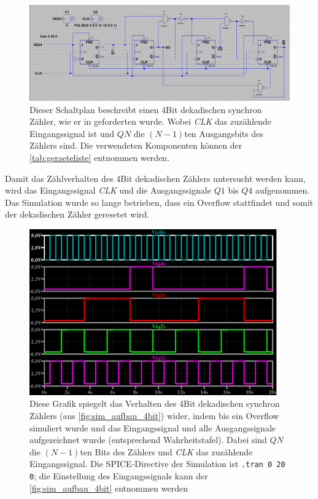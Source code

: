 \documentclass[12pt,english,ngerman]{scrartcl}
\begin{document}
\begin{figure}[H]
  \centering
    \includegraphics[width=\linewidth]{./figures/sim/4bit/aufbau4bit.png}
    \caption{Dieser Schaltplan beschreibt einen 4Bit dekadischen synchron
      Zähler, wie er in  geforderten wurde. Wobei
      \textit{CLK} das zuzählende Eingangssignal ist und $QN$ die $(N-1)$ten
      Ausgangsbits des Zählers sind. Die verwendeten Komponenten können der
      \autoref{tab:geraeteliste} entnommen werden.}
  \label{fig:sim_aufbau_4bit}
\end{figure}

Damit das Zählverhalten des 4Bit dekadischen Zählers untersucht werden kann,
wird das Eingangssignal \textit{CLK} und die Ausgangssignale $Q1$ bis $Q4$
aufgenommen. Das Simulation wurde so lange betrieben, dass ein Overflow
stattfindet und somit der dekadischen Zähler geresetet wird. 

\begin{figure}[H]
  \centering
    \includegraphics[width=0.95\textwidth]{./figures/sim/4bit/4bitdekawahrheit.png}
  \caption{Diese Grafik spiegelt das Verhalten des
    4Bit dekadischen synchron Zählers (aus \autoref{fig:sim_aufbau_4bit})
    wider, indem bis ein Overflow simuliert wurde und das Eingangssignal und
    alle Ausgangssignale aufgezeichnet wurde (entsprechend Wahrheitstafel).
    Dabei sind $QN$ die $(N-1)$ten Bits des Zählers und \textit{CLK} das zuzählende
    Eingangssignal. Die SPICE-Directive der Simulation ist \texttt{.tran 0 20 0}; die
    Einstellung des Eingangssignals kann der \autoref{fig:sim_aufbau_4bit}
    entnommen werden}
  \label{fig:sim_alarm_wahrheit}
\end{figure}
\end{document}
